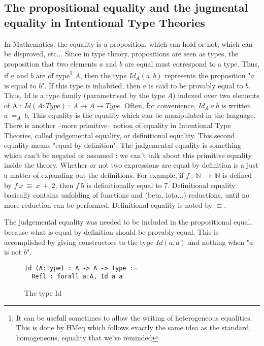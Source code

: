\subsection{The propositional equality and the jugmental equality in Intentional Type Theories}
In Mathematics, the equality is a proposition, which can hold or not, which can be disproved, etc...
Since in type theory, propositions are seen as types, the proposition that two elements $a$ and $b$ are equal must correspond to a type. Thus, if $a$ and $b$ are of type\footnote{It can be usefull sometimes to allow the writing of heterogeneous equalities. This is done by HMeq which follows exactly the same idea as the standard, homogeneous, equality that we've reminded} $A$, then the type $Id_A(a, b)$ represents the proposition "$a$ is equal to $b$". If this type is inhabited, then $a$ is said to be provably equal to $b$.
Thus, Id is a type family (parametrised by the type $A$) indexed over two elements of A : $Id (A:Type)\ :\ A \rightarrow A \rightarrow Type$. Often, for convenience, $Id_A\ a\ b$ is written $a\ =_A\ b$.
This equality is the equality which can be manipulated in the language. There is another --more primitive-- notion of equality in Intentional Type Theories, called judgemental equality, or definitional equality. This second equality means "equal by definition". The judgemental equality is something which can't be negated or assumed : we can't talk about this primitive equality inside the theory. Whether or not two expressions are equal by definition is a just a matter of expanding out the definitions. For example, if $f\ :\ \mathbb{N}\ \rightarrow\ \mathbb{N}$ is defined by $f\ x\ \equiv\ x\ +\ 2$, then $f\ 5$ is definitionally equal to $7$. Definitional equality basically contains unfolding of functions and (beta, iota...) reductions, until no more reduction can be performed.
Definitional equality is noted by $\equiv$.

The judgemental equality was needed to be included in the propositional equal, because what is equal by definition should be provably equal.
This is accomplished by giving constructors to the type $Id(a,a)$ and nothing when "$a$ is not $b$".
\begin{figure}[H]
\figrule
\begin{center}
\begin{verbatim}
Id (A:Type) : A -> A -> Type :=
  Refl : forall a:A, Id a a
\end{verbatim}
\end{center}
\caption{The type Id}
\figrule
\end{figure}

